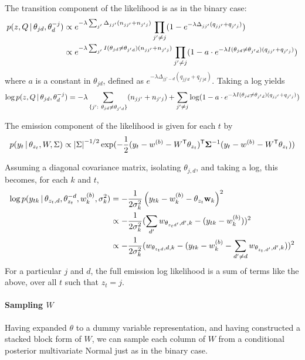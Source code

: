 The transition component of the likelihood is as in the binary case:
\begin{align}
  p(z, Q \, \vert \, \theta_{jd}, \theta_{d}^{-j}) & \propto
  e^{-\lambda\sum_{j'} \Delta_{jj'} (n_{jj'} + n_{j'j})} \prod_{j'
    \neq j} (1 - e^{-\lambda\Delta_{jj'} (q_{jj'} + q_{j'j})})\\
  &\propto e^{-\lambda \sum_{j'} I(\theta_{jd} \neq \theta_{j'd})
    (n_{jj'} + n_{j'j})} \prod_{j'
    \neq j} (1 - a\cdot e^{-\lambda I(\theta_{jd} \neq \theta_{j'd}) (q_{jj'} + q_{j'j})})
\end{align}
where $a$ is a constant in $\theta_{jd}$, defined as $e^{-\lambda
  \Delta_{jj'-d} (q_{jj'd} + q_{j'jd})}$.  Taking a log yields
\begin{equation}
  \log p(z, Q \, \vert \, \theta_{jd}, \theta_{d}^{-j}) =
  -\lambda \sum_{\{j':\ \theta_{jd} \neq \theta_{j'd}\}} (n_{jj'} +
  n_{j'j}) + \sum_{j'
    \neq j} \log(1 - a\cdot e^{-\lambda I(\theta_{jd} \neq \theta_{j'd}) (q_{jj'} + q_{j'j})})
\end{equation}

The emission component of the likelihood is given for each $t$ by
\begin{equation}
  p(y_t \, \vert \, \theta_{z_t}, W, \Sigma) \propto \left\vert \Sigma \right\vert^{-1/2}
  \exp(-\frac{1}{2} (y_t - w^{(b)} -
  W^{\sf T} \theta_{z_t})^{\sf T}\boldsymbol{\Sigma}^{-1}(y_t - w^{(b)} - W^{\sf T} \theta_{z_t}))
\end{equation}

Assuming a diagonal covariance matrix, isolating $\theta_{j,d}$, and
taking a log, this becomes, for each $k$ and $t$,
\begin{align}
  \log p(y_{tk} \, \vert \, \theta_{z_t,d}, \theta_{z_t}^{-d}, w^{(b)}_k, \sigma^2_k) &=
   -\frac{1}{2\sigma^2_k} \left(y_{tk} -
      w^{(b)}_k-\theta_{z_t}\mathbf{w}_k\right)^2 \\
  &\propto -\frac{1}{2\sigma^2_k} (\sum_{d'} w_{\theta_{z_td'},d',k} -
    (y_{tk} - w^{(b)}_k))^2 \\
  &\propto -\frac{1}{2\sigma^2_k}(w_{\theta_{z_td},d,k} - (y_{tk} -
    w^{(b)}_k - \sum_{d' \neq d} w_{\theta_{z_t,d'},d',k}))^2
\end{align}
For a particular $j$ and $d$, the full emission log likelihood is a sum of
terms like the above, over all $t$ such that $z_t = j$.

\paragraph{Sampling $W$}
Having expanded $\theta$ to a dummy variable representation, and
having constructed a stacked block form of $W$, we can sample each
column of $W$ from a conditional posterior multivariate Normal just
as in the binary case.

